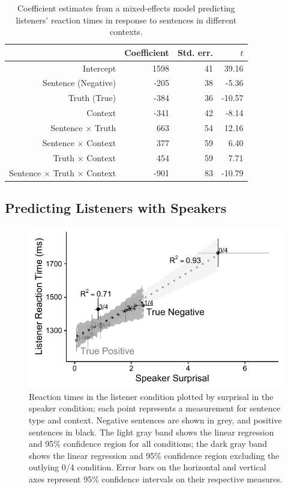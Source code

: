 \documentclass[man, noapacite]{apa2}
\begin{document}
\begin{table}[t]
\caption{\label{tab:listenermodel} Coefficient estimates from a mixed-effects model predicting listeners' reaction times in response to sentences in different contexts.}
\begin{center}
\begin{tabular}{rrrr}
  \hline
 & Coefficient & Std. err. & $t$ \\
  \hline
Intercept & 1598 & 41 & 39.16 \\
  Sentence (Negative) & -205 & 38 & -5.36  \\
  Truth (True) & -384 & 36 & -10.57 \\
  Context & -341 & 42 & -8.14 \\
  Sentence $\times$ Truth & 663 & 54 & 12.16 \\
  Sentence $\times$ Context & 377 & 59 & 6.40 \\
  Truth $\times$ Context & 454 & 59 & 7.71 \\
  Sentence $\times$ Truth $\times$ Context & -901 & 83 & -10.79 \\
   \hline
\end{tabular}
\vspace{-1.5cm}
\end{center}
\end{table}


\subsection{Predicting Listeners with Speakers}

\begin{figure}[t]
\begin{center}
\includegraphics[width=5in]{figures/surprisal_rt_v2.pdf}
\caption{\label{fig:scatter} Reaction times in the listener condition plotted by surprisal in the speaker condition; each point represents a measurement for sentence type and context. Negative sentences are shown in grey, and positive sentences in black. The light gray band shows the linear regression and  95\% confidence region for all conditions; the dark gray band shows the linear regression and 95\% confidence region excluding the outlying 0/4 condition.  Error bars on the horizontal and vertical axes represent 95\% confidence intervals on their respective measures.}
\end{center}
\end{figure}
\end{document}
